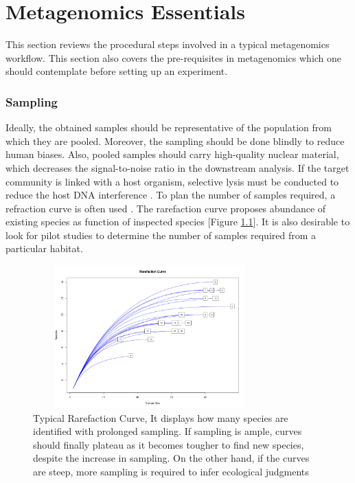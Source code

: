 \chapter{Metagenomics Essentials}
 \setcounter{page}{4}

This section reviews the procedural steps involved in a typical metagenomics workflow. This section also covers the pre-requisites in metagenomics which one should contemplate before setting up an experiment.

\subsection{Sampling}
Ideally, the obtained samples should be representative of the population from which they are pooled. Moreover, the sampling should be done blindly to reduce human biases. Also, pooled samples should carry high-quality nuclear material, which decreases the signal-to-noise ratio in the downstream analysis. If the target community is linked with a host organism, selective lysis must be conducted to reduce the host DNA interference \cite{ref11}. To plan the number of samples required, a refraction curve is often used \cite{ref11}. The rarefaction curve proposes abundance of existing species as function of inspected species [Figure \ref{fig:figure1}]. It is also desirable to look for pilot studies to determine the number of samples required from a particular habitat.

\begin{figure}
  \centering
  \includegraphics[width=9cm, height=5.5cm] {../figures/Figure1.png}
  \caption{Typical Rarefaction Curve, It displays how many species are identified with prolonged sampling. If sampling is ample, curves should finally plateau as it becomes tougher to find new species, despite the increase in sampling. On the other hand, if the curves are steep, more sampling is required to infer ecological judgments \cite{ref11}}
  \label{fig:figure1}
\end{figure}

